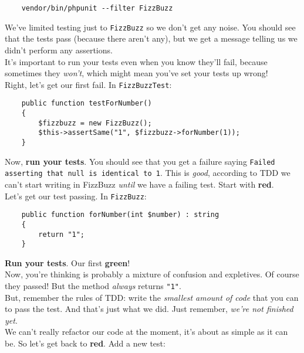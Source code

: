 \begin{verbatim}
    vendor/bin/phpunit --filter FizzBuzz
\end{verbatim}

We've limited testing just to \texttt{FizzBuzz} so we don't get any noise. You should see that the tests pass (because there aren't any), but we get a message telling us we didn't perform any assertions.
\\

It's important to run your tests even when you know they'll fail, because sometimes they \textit{won't}, which might mean you've set your tests up wrong!
\\

Right, let's get our first fail. In \texttt{FizzBuzzTest}:

\begin{verbatim}
    public function testForNumber()
    {
        $fizzbuzz = new FizzBuzz();
        $this->assertSame("1", $fizzbuzz->forNumber(1));
    }
\end{verbatim}

Now, \textbf{run your tests}. You should see that you get a failure saying \texttt{Failed asserting that null is identical to \textquotesingle{}1\textquotesingle{}}. This is \textit{good}, according to TDD we can't start writing in FizzBuzz \textit{until} we have a failing test. Start with \textbf{red}.
\\

Let's get our test passing. In \texttt{FizzBuzz}:

\begin{verbatim}
    public function forNumber(int $number) : string
    {
        return "1";
    }
\end{verbatim}

\textbf{Run your tests}. Our first \textbf{green}!
\\

Now, you're thinking is probably a mixture of confusion and expletives. Of course they passed! But the method \textit{always} returns \texttt{"1"}.
\\

But, remember the rules of TDD: write the \textit{smallest amount of code} that you can to pass the test. And that's just what we did. Just remember, \textit{we're not finished yet}.
\\

We can't really refactor our code at the moment, it's about as simple as it can be. So let's get back to \textbf{red}. Add a new test:

